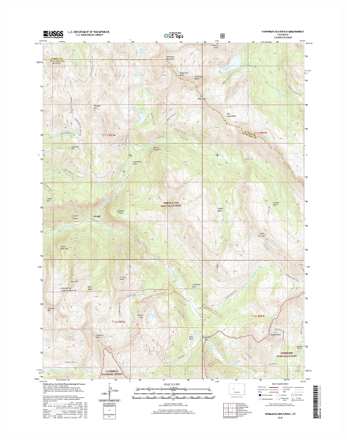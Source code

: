 \documentclass[12pt]{amsbook}
\begin{document}
\begin{problem}
\begin{figure}[H]
		\includegraphics[width=1.2\textwidth]{figures/snowmass_topo.jpg}
	\end{figure}
\end{problem}

\newpage
\end{document}
